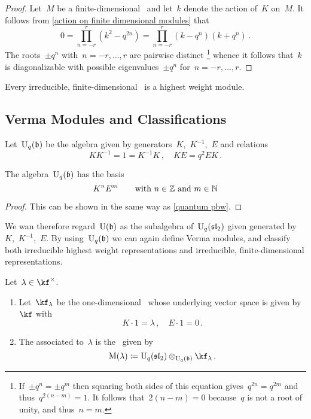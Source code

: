 \documentclass[a4paper, 11pt, oneside]{scrartcl}
\begin{document}
\begin{proof}
  Let~$M$ be a finite-dimensional~ and let~$k$ denote the action of~$K$ on~$M$.
  It follows from \cref{action on finite dimensional modules} that
  \[
    0
    =
    \prod_{n = -r}^r ( k^2 - q^{2n} )
    =
    \prod_{n = -r}^r ( k - q^n ) ( k + q^n ) \,.
  \]
  The roots~$\pm q^n$ with~$n = -r, \dotsc, r$ are pairwise distinct%
  \footnote{
    If~$\pm q^n = \pm q^m$ then squaring both sides of this equation gives~$q^{2n} = q^{2m}$ and thus~$q^{2(n-m)} = 1$.
    It follows that~$2(n-m) = 0$ because~$q$ is not a root of unity, and thus~$n = m$.
  }
  whence it follows that~$k$ is diagonalizable with possible eigenvalues~$\pm q^n$ for~$n = -r, \dotsc, r$.
\end{proof}

\begin{corollary}
  Every irreducible, finite-dimensional~ is a highest weight module.
\end{corollary}



\subsection{Verma Modules and Classifications}

\begin{definition}
  Let~$\operatorname{U}_q(\mathfrak{b})$ be the algebra given by generators~$K$,~$K^{-1}$,~$E$ and relations
  \[
    K K^{-1} = 1 = K^{-1} K \,,
    \quad
    K E = q^2 E K \,.
  \]
\end{definition}

\begin{proposition}
  The algebra~$\operatorname{U}_q(\mathfrak{b})$ has the basis
  \[
    K^n E^m
    \qquad
    \text{with~$n \in \mathbb{Z}$ and~$m \in \mathbb{N}$}
  \]
\end{proposition}

\begin{proof}
  This can be shown in the same way as \cref{quantum pbw}.
\end{proof}

We wan therefore regard~$\operatorname{U}(\mathfrak{b})$ as the subalgebra of~$\operatorname{U}_q(\mathfrak{sl}_2)$ given generated by~$K$,~$K^{-1}$,~$E$.
By using~$\operatorname{U}_q(\mathfrak{b})$ we can again define Verma modules, and classify both irreducible highest weight representations and irreducible, finite-dimensional representations.

\begin{definition}
  Let~$\lambda \in \kf^\times$.
  \begin{enumerate}
    \item
      Let~$\kf_\lambda$ be the one-dimensional~ whose underlying vector space is given by~$\kf$ with
      \[
        K \cdot 1 = \lambda \,,
        \quad
        E \cdot 1 = 0 \,.
      \]
    \item
      The  associated to~$\lambda$ is the~ given by
      \[
        \verma(\lambda)
        \defined
        \Univ_q(\sllie_2) \tensor_{\Univ_q(\blie)} \kf_\lambda \,.
      \]
  \end{enumerate}
\end{definition}
\end{document}
